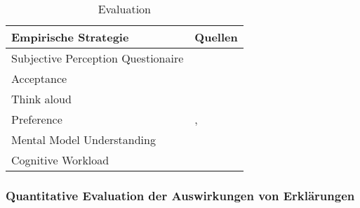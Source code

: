 \begin{table}[htb!]
    \begin{center}
        \begin{tabular}{|p{}|p{}|}
            \hline
            \textbf{Empirische Strategie} & \textbf{Quellen} \\ \hline
            Subjective Perception Questionaire &  \cite{balog_measuring_2020} \cite{sato_context_nodate}
                                                                \cite{waa_evaluating_2021} \cite{eiband_impact_2019}  \cite{kouki_user_2017} \cite{tsai_evaluating_2019}
                                                                \cite{hernandez-bocanegra_effects_2020}
                                                                \cite{zahedi_towards_2019} \cite{tsai_effects_2020} 
                                                                \cite{ribera2019can} \\
            Acceptance                        & \cite{tintarev_designing_nodate}
                                                            \cite{hernandez-bocanegra_effects_2020}
                                                            \cite{kunkel_let_2019} \\
            Think aloud                       & \cite{wiegand_id_2020} \cite{yamada_evaluating_2016} \\
            Preference                        & \cite{kouki_user_2017} \cite{mucha_interfaces_2021} 
                                                            \cite{abdulrahman_belief-based_2019} 
                                                            \cite{waa_evaluating_2021} \cite{wiegand_id_2020} ,
                                                            \cite{stange_effects_2021} \cite{kaptein_personalised_2017} \\
            Mental Model Understanding        & \cite{gunning2019darpa} \\
            Cognitive Workload                & \cite{wiegand2019drive, wiegand_id_2020} \\
            \hline
        \end{tabular}
    \end{center}
    \caption{Evaluation}
    \label{tab:evaluation_of_explanations}
\end{table}

\subsubsection{Quantitative Evaluation der Auswirkungen von Erklärungen}

